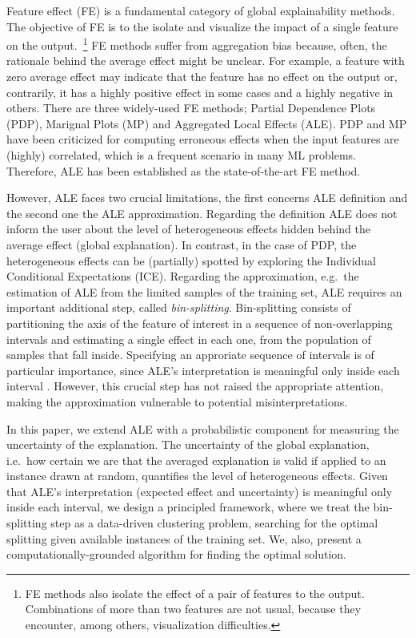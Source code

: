 \documentclass[twoside]{article}
\begin{document}
Feature effect (FE) \citep{Gromping2020MAEP} is a fundamental category
of global explainability methods. The objective of FE is to the
isolate and visualize the impact of a single feature on the
output.~\footnote{FE methods also isolate the effect of a pair of
  features to the output. Combinations of more than two features are
  not usual, because they encounter, among others, visualization
  difficulties.} FE methods suffer from aggregation bias because,
often, the rationale behind the average effect might be unclear. For
example, a feature with zero average effect may indicate that the
feature has no effect on the output or, contrarily, it has a highly
positive effect in some cases and a highly negative in others. There
are three widely-used FE methods; Partial Dependence Plots
(PDP)\citep{friedman2001greedy}, Marignal Plots
(MP)\citep{apley2020visualizing} and Aggregated Local Effects
(ALE)\citep{apley2020visualizing}. PDP and MP have been criticized for
computing erroneous effects when the input features are (highly)
correlated, which is a frequent scenario in many ML
problems. Therefore, ALE has been established as the state-of-the-art
FE method.

However, ALE faces two crucial limitations, the first concerns ALE
definition and the second one the ALE approximation. Regarding the
definition ALE does not inform the user about the level of
heterogeneous effects hidden behind the average effect (global
explanation). In contrast, in the case of PDP, the heterogeneous
effects can be (partially) spotted by exploring the Individual
Conditional Expectations (ICE)\citep{goldstein2015peeking}. Regarding
the approximation, e.g.~the estimation of ALE from the limited samples
of the training set, ALE requires an important additional step, called
\textit{bin-splitting}. Bin-splitting consists of partitioning the
axis of the feature of interest in a sequence of non-overlapping
intervals and estimating a single effect in each one, from the
population of samples that fall inside. Specifying an approriate
sequence of intervals is of particular importance, since ALE's
interpretation is meaningful only inside each interval
\citep{molnar2022}. However, this crucial step has not raised the
appropriate attention, making the approximation vulnerable to
potential misinterpretations.

In this paper, we extend ALE with a probabilistic component for
measuring the uncertainty of the explanation. The uncertainty of the
global explanation, i.e.~how certain we are that the averaged
explanation is valid if applied to an instance drawn at random,
quantifies the level of heterogeneous effects. Given that ALE's
interpretation (expected effect and uncertainty) is meaningful only
inside each interval, we design a principled framework, where we treat
the bin-splitting step as a data-driven clustering problem, searching
for the optimal splitting given available instances of the training
set. We, also, present a computationally-grounded algorithm for
finding the optimal solution.
\end{document}
